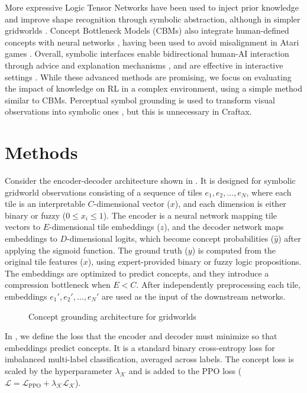 \documentclass[final]{nesy2026}
\begin{document}
More expressive Logic Tensor Networks \citep{serafini2016} have been used to inject prior knowledge and improve shape recognition through symbolic abstraction, although in simpler gridworlds \citep{badreddine2019,amador2025}. 
Concept Bottleneck Models (CBMs) also integrate human-defined concepts with neural networks \citep{koh2020}, having been used to avoid misalignment in Atari games \citep{delfosse2024}.
Overall, symbolic interfaces enable bidirectional human-AI interaction through advice and explanation mechanisms \citep{kambhampati2022}, and are effective in interactive settings \citep{guan2021}.
While these advanced methods are promising, we focus on evaluating the impact of knowledge on RL in a complex environment, using a simple method similar to CBMs.
Perceptual symbol grounding is used to transform visual observations into symbolic ones \citep{su2026}, but this is unnecessary in Craftax.

\section{Methods}
\label{sec:methods}

Consider the encoder-decoder architecture shown in .
It is designed for symbolic gridworld observations consisting of a sequence of tiles $e_1, e_2, \ldots, e_N$, where each tile is an interpretable $C$-dimensional vector ($x$), and each dimension is either binary or fuzzy ($0 \le x_i \le 1$).
The encoder is a neural network mapping tile vectors to $E$-dimensional tile embeddings ($z$), and the decoder network maps embeddings to $D$-dimensional logits, which become concept probabilities ($\hat y$) after applying the sigmoid function.
The ground truth ($y$) is computed from the original tile features ($x$), using expert-provided binary or fuzzy logic propositions.
The embeddings are optimized to predict concepts, and they introduce a compression bottleneck when $E < C$.
After independently preprocessing each tile, embeddings $e_1', e_2', \ldots, e_N'$ are used as the input of the downstream networks.

\begin{figure}[htbp]
    \centering
    \resizebox{0.8\textwidth}{!}{}
    \caption{Concept grounding architecture for gridworlds}
    \label{fig:architecture}
\end{figure}

In , we define the loss that the encoder and decoder must minimize so that embeddings predict concepts.
It is a standard binary cross-entropy loss for imbalanced multi-label classification, averaged across labels. The concept loss is scaled by the hyperparameter $\lambda_{\mathcal K}$ and is added to the PPO loss ($\mathcal L = \mathcal L_{\text{PPO}} + \lambda_{\mathcal K} \mathcal{L_K}$).
\end{document}
